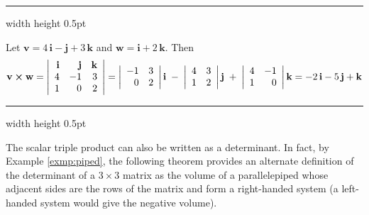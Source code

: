 \vspace{2mm}
\hrule width \textwidth height 0.5pt
\begin{exmp}
 Let $\textbf{v} = 4\,\textbf{i} - \textbf{j} + 3\,\textbf{k}$ and $\textbf{w} = \textbf{i} + 2\,\textbf{k}$. Then
 \begin{displaymath}
  \textbf{v} \bm{\times} \textbf{w} =
  \left|
  \begin{array}{rrr}
   \textbf{i} & \textbf{j} & \textbf{k}\\
   4 & -1 & 3\\
   1 & 0 & 2
  \end{array}\right|
  = \left|\begin{array}{rr} -1 & 3 \\ 0 & 2 \end{array}\right| \textbf{i} \;-\;
  \left|\begin{array}{rr} 4 & 3 \\ 1 & 2 \end{array}\right| \textbf{j} \;+\;
  \left|\begin{array}{rr} 4 & -1 \\ 1 & 0 \end{array}\right| \textbf{k}
  = -2\,\textbf{i} - 5\,\textbf{j} + \textbf{k}
 \end{displaymath}
\end{exmp}
\hrule width \textwidth height 0.5pt
\vspace{2mm}

The scalar triple product can also be written as a determinant. In fact, by Example \ref{exmp:piped}, the following
theorem provides an alternate definition of the determinant of a $3 \times 3$ matrix as the volume
of a parallelepiped whose adjacent sides are the rows of the matrix and form a right-handed system (a
left-handed system would give the negative volume).


